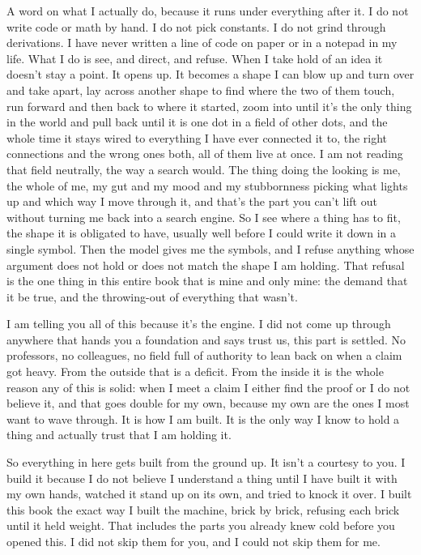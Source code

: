 \documentclass[11pt,twoside]{article}
\theoremstyle{thielethm}
\theoremstyle{thieledef}
\theoremstyle{thieledef}
\theoremstyle{thieledef}
\theoremstyle{thielethm}
\theoremstyle{thieleobs}
\theoremstyle{thielethm}
\begin{document}
A word on what I actually do, because it runs under everything after it. I do not write code or math by hand. I do not pick constants. I do not grind through derivations. I have never written a line of code on paper or in a notepad in my life. What I do is see, and direct, and refuse. When I take hold of an idea it doesn't stay a point. It opens up. It becomes a shape I can blow up and turn over and take apart, lay across another shape to find where the two of them touch, run forward and then back to where it started, zoom into until it's the only thing in the world and pull back until it is one dot in a field of other dots, and the whole time it stays wired to everything I have ever connected it to, the right connections and the wrong ones both, all of them live at once. I am not reading that field neutrally, the way a search would. The thing doing the looking is me, the whole of me, my gut and my mood and my stubbornness picking what lights up and which way I move through it, and that's the part you can't lift out without turning me back into a search engine. So I see where a thing has to fit, the shape it is obligated to have, usually well before I could write it down in a single symbol. Then the model gives me the symbols, and I refuse anything whose argument does not hold or does not match the shape I am holding. That refusal is the one thing in this entire book that is mine and only mine: the demand that it be true, and the throwing-out of everything that wasn't.

I am telling you all of this because it's the engine. I did not come up through anywhere that hands you a foundation and says trust us, this part is settled. No professors, no colleagues, no field full of authority to lean back on when a claim got heavy. From the outside that is a deficit. From the inside it is the whole reason any of this is solid: when I meet a claim I either find the proof or I do not believe it, and that goes double for my own, because my own are the ones I most want to wave through. It is how I am built. It is the only way I know to hold a thing and actually trust that I am holding it.

So everything in here gets built from the ground up. It isn't a courtesy to you. I build it because I do not believe I understand a thing until I have built it with my own hands, watched it stand up on its own, and tried to knock it over. I built this book the exact way I built the machine, brick by brick, refusing each brick until it held weight. That includes the parts you already knew cold before you opened this. I did not skip them for you, and I could not skip them for me.
\end{document}
